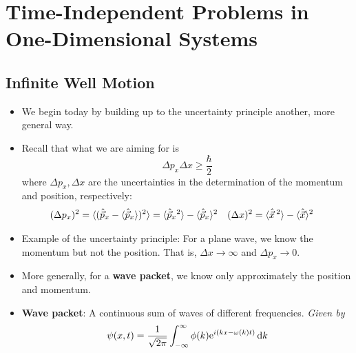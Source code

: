 \documentclass[../notes.tex]{subfiles}
\begin{document}
\chapter{Time-Independent Problems in One-Dimensional Systems}
\section{Infinite Well Motion}
\begin{itemize}
    \item {}We begin today by building up to the uncertainty principle another, more general way.
    \item Recall that what we are aiming for is
    \begin{equation*}
        \Delta p_x\Delta x \geq \frac{\hbar}{2}
    \end{equation*}
    where $\Delta p_x,\Delta x$ are the uncertainties in the determination of the momentum and position, respectively:
    \begin{align*}
        (\Delta p_x)^2 &= \Exp{(\hat{\vec{p}}_x-\Exp{\hat{\vec{p}}_x})^2} = \Exp{\hat{\vec{p}}_x{}^2}-\Exp{\hat{\vec{p}}_x}^2&
        (\Delta x)^2 &= \Exp{\hat{\vec{x}}{\,}^2}-\Exp{\hat{\vec{x}}}^2
    \end{align*}
    \item Example of the uncertainty principle: For a plane wave, we know the momentum but not the position. That is, $\Delta x\to\infty$ and $\Delta p_x\to 0$.
    \item More generally, for a \textbf{wave packet}, we know only approximately the position and momentum.
    \item \textbf{Wave packet}: A continuous sum of waves of different frequencies. \emph{Given by}
    \begin{equation*}
        \psi(x,t) = \frac{1}{\sqrt{2\pi}}\int_{-\infty}^\infty\phi(k)\e[i(kx-\omega(k)t)]\dd{k}
    \end{equation*}
    \begin{figure}[h!]
        \centering
        \begin{subfigure}[b]{0.4\linewidth}
            \centering
\end{subfigure}
\end{figure}
\end{itemize}
\end{document}
